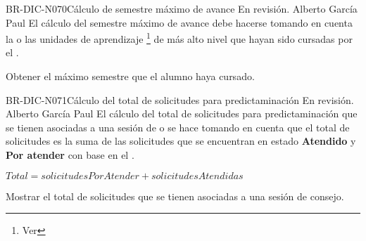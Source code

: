 \begin{BusinessRule}{BR-DIC-N070}{Cálculo de semestre máximo de avance}
	{\bcDerivation}    %
	{\btEnabler}     %
	{\blControlling}    %
	\BRItem[Estado] En revisión.
	 Alberto García Paul 
	\BRItem[Descripción] El cálculo del semestre máximo de avance debe hacerse tomando en cuenta la o las unidades de aprendizaje \footnote{Ver } de más alto nivel que hayan sido cursadas por el .
	\BRItem[Sentencia]	\cdtEmpty
	
	
	\BRItem[Motivacion] Obtener el máximo semestre que el alumno haya cursado.
	
	
\end{BusinessRule}

\begin{BusinessRule}{BR-DIC-N071}{Cálculo del total de solicitudes para predictaminación}
	{\bcDerivation}    %
	{\btTimer}     %
	{\blInfluencing}    %
	\BRItem[Estado] En revisión.
	 Alberto García Paul 
	\BRItem[Descripción] El cálculo del total de solicitudes para predictaminación que se tienen asociadas a una sesión de  o  se hace tomando en cuenta que el total de solicitudes es la suma de las solicitudes que se encuentran en estado \textbf{Atendido} y \textbf{Por atender} con base en el .
	\BRItem[Sentencia]	\cdtEmpty
	
	$ Total = solicitudesPorAtender + solicitudesAtendidas$
	
	\BRItem[Motivacion] Mostrar el total de solicitudes que se tienen asociadas a una sesión de consejo.
	
\end{BusinessRule}


